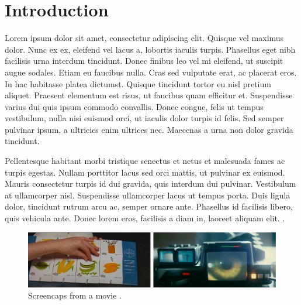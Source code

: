 \chapter{Introduction}
\label{chp:b1}

Lorem ipsum dolor sit amet, consectetur adipiscing elit. Quisque vel maximus dolor. Nunc ex ex, eleifend vel lacus a, lobortis iaculis turpis. Phasellus eget nibh facilisis urna interdum tincidunt. Donec finibus leo vel mi eleifend, ut suscipit augue sodales. Etiam eu faucibus nulla. Cras sed vulputate erat, ac placerat eros. In hac habitasse platea dictumst. Quisque tincidunt tortor eu nisl pretium aliquet. Praesent elementum est risus, ut faucibus quam efficitur et. Suspendisse varius dui quis ipsum commodo convallis. Donec congue, felis ut tempus vestibulum, nulla nisi euismod orci, ut iaculis dolor turpis id felis. Sed semper pulvinar ipsum, a ultricies enim ultrices nec. Maecenas a urna non dolor gravida tincidunt.

Pellentesque habitant morbi tristique senectus et netus et malesuada fames ac turpis egestas. Nullam porttitor lacus sed orci mattis, ut pulvinar ex euismod. Mauris consectetur turpis id dui gravida, quis interdum dui pulvinar. Vestibulum at ullamcorper nisl. Suspendisse ullamcorper lacus ut tempus porta. Duis ligula dolor, tincidunt rutrum arcu ac, semper ornare ante. Phasellus id facilisis libero, quis vehicula ante. Donec lorem eros, facilisis a diam in, laoreet aliquam elit. \parencite{aaltonenHowWeMake2005}.
	

	\begin{figure}[h!]
			\centering
			\includegraphics[width=.8\textwidth]{figures/2001-Bladerunner.jpg}
			\caption{Screencaps from a movie \parencite{bladeRunner}.}
			\label{fig:movies}
	\end{figure}

	

